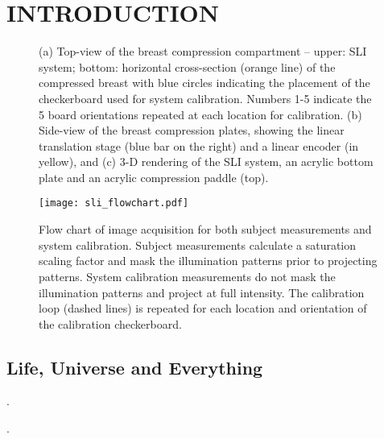 
\chapter{INTRODUCTION} %
\label{chap:intro}


\begin{figure}
	\begin{center}
	\end{center}
	\caption{ (a) Top-view of the breast compression compartment -- upper: SLI system; bottom: horizontal cross-section (orange line) of the compressed breast with blue circles indicating the placement of the checkerboard used for system calibration. Numbers 1-5 indicate the 5 board orientations repeated at each location for calibration. (b) Side-view of the breast compression plates, showing the linear translation stage (blue bar on the right) and a linear encoder (in yellow), and  (c) 3-D rendering of the SLI system, an acrylic bottom plate and an acrylic compression paddle (top). } 
	\label{fig:mammographysetup}
\end{figure} 


\begin{figure}
    \begin{center}
    \texttt{[image: sli\_flowchart.pdf]}
    \end{center}
    \caption{Flow chart of image acquisition for both subject measurements and system calibration. Subject measurements calculate a saturation scaling factor and mask the illumination patterns prior to projecting patterns. System calibration measurements do not mask the illumination patterns and project at full intensity. The calibration loop (dashed lines) is repeated for each location and orientation of the calibration checkerboard.} 
    \label{fig:sli_flowchart}
\end{figure} 



\section{Life, Universe and Everything}
\label{chap:intro:design}

. 

.




